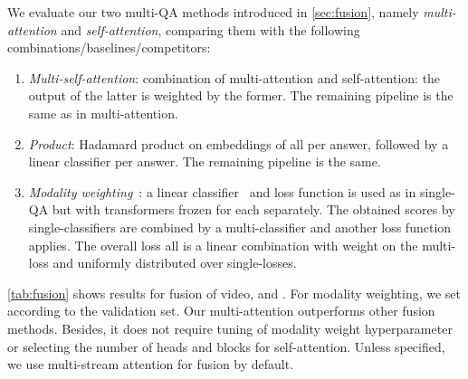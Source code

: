 \documentclass[10pt,twocolumn,letterpaper]{article}
\makeatletter
\renewcommand\paragraph{\@startsection{paragraph}{4}{\z@}{1ex}{-1em}{\normalfont\normalsize\bfseries}}
\makeatother
\begin{document}
\paragraph{Multi-\branch results} 

We evaluate our two multi-\branch QA methods introduced in \autoref{sec:fusion}, namely \emph{multi-\branch attention} and \emph{self-attention}, comparing them with the following combinations/baselines/competitors:\\

\begin{enumerate}[itemsep=3pt, parsep=0pt, topsep=2pt]
	\item \emph{Multi-\branch self-attention}: combination of multi-\branch attention and self-attention: the output of the latter is weighted by the former. The remaining pipeline is the same as in multi-\branch attention.
	\item \emph{Product}: Hadamard product on embeddings of all \branches per answer, followed by a linear classifier per answer. The remaining pipeline is the same.
	\item \emph{Modality weighting}~\cite{garcia2020knowledge}: a linear classifier~ and loss function is used as in single-\branch QA but with transformers frozen for each \branch separately. The obtained scores by single-\branch classifiers are combined by a multi-\branch classifier and another loss function applies. The overall loss all is a linear combination with weight  on the multi-\branch loss and  uniformly distributed over single-\branch losses.
\end{enumerate}

\autoref{tab:fusion} shows results for fusion of video, \sceneSum and \episodeSum. For modality weighting, we set  according to the validation set. Our multi-\branch attention outperforms other fusion methods. Besides, it does not require tuning of modality weight hyperparameter  or selecting the number of heads and blocks for self-attention. Unless specified, we use multi-stream attention for fusion by default.
\end{document}
